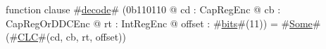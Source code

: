 function clause #\hyperref[zdecode]{decode}# (0b110110 @ cd : CapRegEnc @ cb : CapRegOrDDCEnc @ rt : IntRegEnc @ offset : #\hyperref[zbits]{bits}#(11)) = #\hyperref[zSome]{Some}#(#\hyperref[zCLC]{CLC}#(cd, cb, rt, offset))

